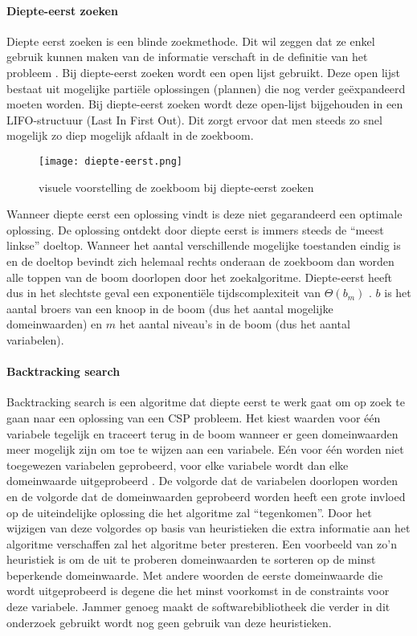 \paragraph{Diepte-eerst zoeken}
Diepte eerst zoeken is een blinde zoekmethode. Dit wil zeggen dat ze enkel gebruik kunnen maken van de informatie verschaft in de definitie van het probleem \autocite{lievens}. Bij diepte-eerst zoeken wordt een open lijst gebruikt. Deze open lijst bestaat uit mogelijke partiële oplossingen (plannen) die nog verder geëxpandeerd moeten worden. Bij diepte-eerst zoeken wordt deze open-lijst bijgehouden in een LIFO-structuur (Last In First Out). Dit zorgt ervoor dat men steeds zo snel mogelijk zo diep mogelijk afdaalt in de zoekboom. \begin{figure}[h]
	\texttt{[image: diepte-eerst.png]}
	\caption{visuele voorstelling de zoekboom bij diepte-eerst zoeken}
\end{figure}
Wanneer diepte eerst een oplossing vindt is deze niet gegarandeerd een optimale oplossing. De oplossing ontdekt door diepte eerst is immers steeds de ``meest linkse'' doeltop. Wanneer het aantal verschillende mogelijke toestanden eindig is en de doeltop bevindt zich helemaal rechts onderaan de zoekboom dan worden alle toppen van de boom doorlopen door het zoekalgoritme. Diepte-eerst heeft dus in het slechtste geval een exponentiële tijdscomplexiteit van $\Theta(b_{m})$ \autocite{lievens}. $b$ is het aantal broers van een knoop in de boom (dus het aantal mogelijke domeinwaarden) en $m$ het aantal niveau's in de boom (dus het aantal variabelen).

\paragraph{Backtracking search}
Backtracking search is een algoritme dat diepte eerst te werk gaat om op zoek te gaan naar een oplossing van een CSP probleem. Het kiest waarden voor één variabele tegelijk en traceert terug in de boom wanneer er geen domeinwaarden meer mogelijk zijn om toe te wijzen aan een variabele. Eén voor één worden niet toegewezen variabelen geprobeerd, voor elke variabele wordt dan elke domeinwaarde uitgeprobeerd \autocite{norvig}. De volgorde dat de variabelen doorlopen worden en de volgorde dat de domeinwaarden geprobeerd worden heeft een grote invloed op de uiteindelijke oplossing die het algoritme zal ``tegenkomen''. Door het wijzigen van deze volgordes op basis van heuristieken die extra informatie aan het algoritme verschaffen zal het algoritme beter presteren. Een voorbeeld van zo'n heuristiek is om de uit te proberen domeinwaarden te sorteren op de minst beperkende domeinwaarde. Met andere woorden de eerste domeinwaarde die wordt uitgeprobeerd is degene die het minst voorkomst in de constraints voor deze variabele. Jammer genoeg maakt de softwarebibliotheek die verder in dit onderzoek gebruikt wordt nog geen gebruik van deze heuristieken.

